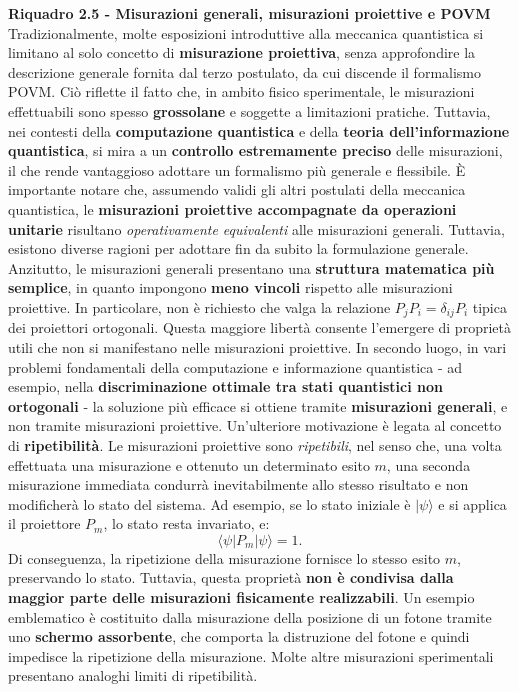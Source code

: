 \documentclass[a4paper,12pt]{report}
\theoremstyle{plain}
\begin{document}
\begin{framed}
\textbf{Riquadro 2.5 - Misurazioni generali, misurazioni proiettive e POVM}
Tradizionalmente, molte esposizioni introduttive alla meccanica quantistica si limitano al solo concetto di \textbf{misurazione proiettiva}, senza approfondire la descrizione generale fornita dal terzo postulato, da cui discende il formalismo POVM. Ciò riflette il fatto che, in ambito fisico sperimentale, le misurazioni effettuabili sono spesso \textbf{grossolane} e soggette a limitazioni pratiche. Tuttavia, nei contesti della \textbf{computazione quantistica} e della \textbf{teoria dell'informazione quantistica}, si mira a un \textbf{controllo estremamente preciso} delle misurazioni, il che rende vantaggioso adottare un formalismo più generale e flessibile.
È importante notare che, assumendo validi gli altri postulati della meccanica quantistica, le \textbf{misurazioni proiettive accompagnate da operazioni unitarie} risultano \textit{operativamente equivalenti} alle misurazioni generali. Tuttavia, esistono diverse ragioni per adottare fin da subito la formulazione generale.
Anzitutto, le misurazioni generali presentano una \textbf{struttura matematica più semplice}, in quanto impongono \textbf{meno vincoli} rispetto alle misurazioni proiettive. In particolare, non è richiesto che valga la relazione $P_j P_i = \delta_{ij} P_i$ tipica dei proiettori ortogonali. Questa maggiore libertà consente l'emergere di proprietà utili che non si manifestano nelle misurazioni proiettive.
In secondo luogo, in vari problemi fondamentali della computazione e informazione quantistica - ad esempio, nella \textbf{discriminazione ottimale tra stati quantistici non ortogonali} - la soluzione più efficace si ottiene tramite \textbf{misurazioni generali}, e non tramite misurazioni proiettive.
Un'ulteriore motivazione è legata al concetto di \textbf{ripetibilità}. Le misurazioni proiettive sono \textit{ripetibili}, nel senso che, una volta effettuata una misurazione e ottenuto un determinato esito $m$, una seconda misurazione immediata condurrà inevitabilmente allo stesso risultato e non modificherà lo stato del sistema. Ad esempio, se lo stato iniziale è $|\psi\rangle$ e si applica il proiettore $P_m$, lo stato resta invariato, e:
\[ \langle\psi|P_m|\psi\rangle = 1. \]
Di conseguenza, la ripetizione della misurazione fornisce lo stesso esito $m$, preservando lo stato.
Tuttavia, questa proprietà \textbf{non è condivisa dalla maggior parte delle misurazioni fisicamente realizzabili}. Un esempio emblematico è costituito dalla misurazione della posizione di un fotone tramite uno \textbf{schermo assorbente}, che comporta la distruzione del fotone e quindi impedisce la ripetizione della misurazione. Molte altre misurazioni sperimentali presentano analoghi limiti di ripetibilità.

\end{framed}
\end{document}
